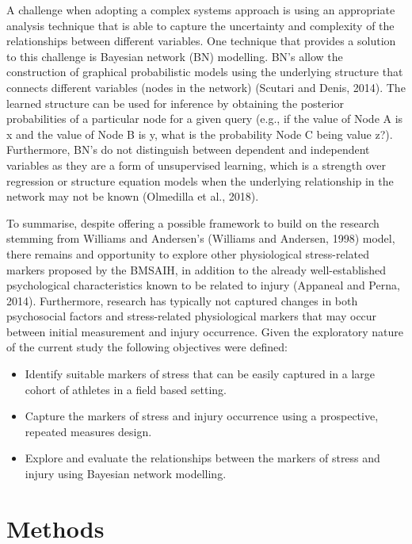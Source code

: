\documentclass[utf8]{frontiersHLTH}
\providecommand{\tightlist}{%
  \setlength{\itemsep}{0pt}\setlength{\parskip}{0pt}}
\begin{document}
A challenge when adopting a complex systems approach is using an
appropriate analysis technique that is able to capture the uncertainty
and complexity of the relationships between different variables. One
technique that provides a solution to this challenge is Bayesian network
(BN) modelling. BN's allow the construction of graphical probabilistic
models using the underlying structure that connects different variables
(nodes in the network) (Scutari and Denis, 2014). The learned structure
can be used for inference by obtaining the posterior probabilities of a
particular node for a given query (e.g., if the value of Node A is x and
the value of Node B is y, what is the probability Node C being value
z?). Furthermore, BN's do not distinguish between dependent and
independent variables as they are a form of unsupervised learning, which
is a strength over regression or structure equation models when the
underlying relationship in the network may not be known (Olmedilla et
al., 2018).

To summarise, despite offering a possible framework to build on the
research stemming from Williams and Andersen's (Williams and Andersen,
1998) model, there remains and opportunity to explore other
physiological stress-related markers proposed by the BMSAIH, in addition
to the already well-established psychological characteristics known to
be related to injury (Appaneal and Perna, 2014). Furthermore, research
has typically not captured changes in both psychosocial factors and
stress-related physiological markers that may occur between initial
measurement and injury occurrence. Given the exploratory nature of the
current study the following objectives were defined:

\begin{itemize}
\tightlist
\item
  Identify suitable markers of stress that can be easily captured in a
  large cohort of athletes in a field based setting.
\item
  Capture the markers of stress and injury occurrence using a
  prospective, repeated measures design.
\item
  Explore and evaluate the relationships between the markers of stress
  and injury using Bayesian network modelling.
\end{itemize}

\hypertarget{methods}{%
\section*{Methods}\label{methods}}
\end{document}
